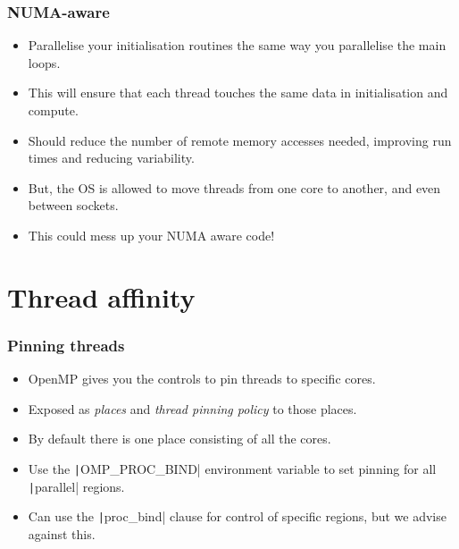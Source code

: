 \documentclass[aspectratio=169]{beamer}
\begin{document}
\begin{frame}
\frametitle{NUMA-aware}
\begin{itemize}
  \item Parallelise your initialisation routines the same way you parallelise the main loops.
  \item This will ensure that each thread touches the same data in initialisation and compute.
  \item Should reduce the number of remote memory accesses needed, improving run times and reducing variability.
  \item But, the OS is allowed to move threads from one core to another, and even between sockets.
  \item This could mess up your NUMA aware code!
\end{itemize}
\end{frame}

\section{Thread affinity}
\begin{frame}
\frametitle{Pinning threads}
\begin{itemize}
  \item OpenMP gives you the controls to pin threads to specific cores.
  \item Exposed as \emph{places} and \emph{thread pinning policy} to those places.
  \item By default there is one place consisting of all the cores.
  \item Use the \texttt|OMP_PROC_BIND| environment variable to set pinning for all \texttt|parallel| regions.
  \item Can use the \texttt|proc_bind| clause for control of specific regions, but we advise against this.
\end{itemize}
\end{frame}
\end{document}
